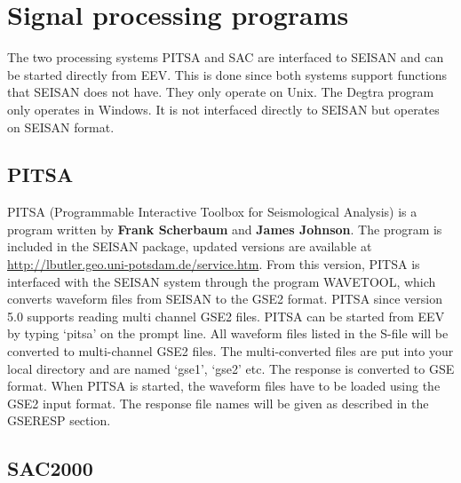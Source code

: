 
\section{Signal processing programs}


The two processing systems PITSA and SAC are interfaced to SEISAN and can be started directly from EEV. This is done since both systems support functions that SEISAN does not have. They only operate on Unix. The Degtra program only operates in Windows. It is not interfaced directly to SEISAN but operates on SEISAN format. 

\subsection{PITSA}
\label{subs:pitsa}

PITSA (Programmable Interactive Toolbox for Seismological Analysis) 
is a program written by \textbf{Frank Scherbaum} and \textbf{James Johnson}. The program 
is included in the SEISAN package, updated versions are available at 
\url{http://lbutler.geo.uni-potsdam.de/service.htm}. From this version, 
PITSA is interfaced with the SEISAN system through the program WAVETOOL, 
which converts waveform files from SEISAN to the GSE2 format. PITSA 
since version 5.0 supports reading multi channel GSE2 files. PITSA 
can be started from EEV by typing `pitsa' on the prompt line. All 
waveform files listed in the S-file will be converted to multi-channel 
GSE2 files.  The multi-converted files are put into your local directory 
and are named `gse1', `gse2' etc. The response is converted to GSE format. 
When PITSA is started, the waveform files have to be loaded using 
the GSE2 input format. The response file names will be given as 
described in the GSERESP section.  

\subsection{SAC2000}



